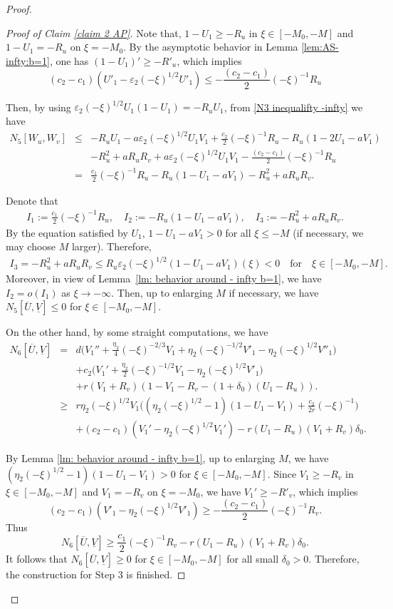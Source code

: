 \documentclass[11pt,a4paper]{article}
\numberwithin{equation}{section}
\numberwithin{figure}{section}
\newcommand\beaa{\begin{eqnarray*}}
\newcommand\eeaa{\end{eqnarray*}}
\begin{document}
\begin{proof}
\begin{proof}[Proof of Claim \ref{claim 2 AP}]
Note that,  $1-U_1\ge -R_u$ in $\xi\in[-M_0,-M]$ and $1-U_1=-R_u$ on $\xi=-M_0$.
By the asymptotic behavior in Lemma \ref{lem:AS-infty:b=1}, one has
$(1-U_1)'\ge -R'_u$, which implies 
$$(c_2-c_1)(U'_1-\varepsilon_2(-\xi)^{1/2}U'_1)\le -\frac{(c_2-c_1)}{2}(-\xi)^{-1}R_u$$


Then, by using 
$\varepsilon_2(-\xi)^{1/2}U_1(1-U_1)=-R_uU_1$, from \eqref{N3 inequalifty -infty} we have
\beaa
N_5[W_u,W_v]&\le&-R_uU_1-a\varepsilon_2(-\xi)^{1/2}U_1V_1+\frac{c_2}{2}(-\xi)^{-1}R_u-R_u(1-2U_1-aV_1)
\\
&&-R_u^2+aR_uR_v+a\varepsilon_2(-\xi)^{1/2}U_1V_1 -\frac{(c_2-c_1)}{2}(-\xi)^{-1}R_u\\
&=&\frac{c_1}{2}(-\xi)^{-1}R_u-R_u(1-U_1-aV_1)-R_u^2+aR_uR_v.
\eeaa

Denote that
\beaa
I_1:=\frac{c_1}{2}(-\xi)^{-1}R_u,\quad
I_2:=-R_u(1-U_1-aV_1),\quad
I_3:=-R_u^2+aR_uR_v.
\eeaa
By the equation satisfied by $U_1$,  $1-U_1-aV_1>0$ for all $\xi\leq -M$ (if necessary, we may choose $M$ larger). Therefore, 
\beaa
I_3=-R_u^2+aR_uR_v\leq R_u\varepsilon_2(-\xi)^{1/2}(1-U_1-aV_1)(\xi)<0\quad \mbox{for}\quad \xi\in[-M_0,-M].
\eeaa
Moreover, in view of Lemma~\ref{lm: behavior around - infty b=1}, we have
$I_2=o(I_1)$ as $\xi\to-\infty$.
Then, up to enlarging $M$ if necessary, we have $N_5[\overline U,\underline V]\le 0$ for $\xi\in[-M_0,-M]$.

On the other hand, by some straight computations, we have
\beaa
N_6[\overline U,\underline V]&=&d\Big(V_1''+\frac{\eta_2}{4}(-\xi)^{-2/3}V_1+\eta_2(-\xi)^{-1/2}V'_1-\eta_2(-\xi)^{1/2}V''_1\Big)\\
&&+c_2\Big(V_1'+\frac{\eta_2}{2}(-\xi)^{-1/2}V_1-\eta_2(-\xi)^{1/2}V'_1\Big)\\&&
+r(V_1+R_v)(1-V_1-R_v-(1+\delta_0)(U_1-R_u)).\\
&\geq& r\eta_2(-\xi)^{1/2}V_1\Big((\eta_2(-\xi)^{1/2}-1)(1-U_1-V_1)
+\frac{c_2}{2r}(-\xi)^{-1}\Big)\\
&&+(c_2-c_1)(V_1'-\eta_2(-\xi)^{1/2}V_1')-r(U_1-R_u)(V_1+R_v)\delta_0.
\eeaa

By Lemma \ref{lm: behavior around - infty b=1},  
up to enlarging $M$, we have 
$(\eta_2(-\xi)^{1/2}-1)(1-U_1-V_1)>0$ for $\xi\in[-M_0,-M]$. 
Since  $V_1\ge -R_v$ in $\xi\in[-M_0,-M]$ and $V_1=-R_v$ on $\xi=-M_0$, we have
$V_1'\ge -R'_v$, which implies 
$$(c_2-c_1)(V'_1-\eta_2(-\xi)^{1/2}V'_1)\ge -\frac{(c_2-c_1)}{2}(-\xi)^{-1}R_v.$$
Thus
$$N_6[\overline U,\underline V]\ge \frac{c_1}{2}(-\xi)^{-1}R_v-r(U_1-R_u)(V_1+R_v)\delta_0.$$
It follows that
$N_6[\overline U,\underline V]\ge 0$ for $\xi\in[-M_0,-M]$
for all small $\delta_0>0$.
Therefore,
the construction for Step 3 is finished.


\end{proof}
\end{proof}
\end{document}
